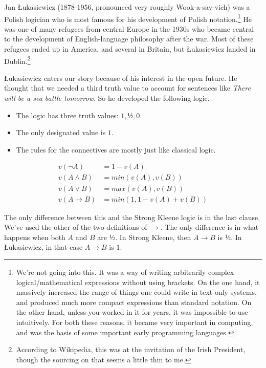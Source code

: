 \documentclass[
]{article}
\providecommand{\tightlist}{%
  \setlength{\itemsep}{0pt}\setlength{\parskip}{0pt}}\usepackage{longtable,booktabs,array}
\begin{document}
Jan Łukasiewicz (1878-1956, pronounced very roughly Wook-a-say-vich) was
a Polish logician who is most famous for his development of Polish
notation.\footnote{We're not going into this. It was a way of writing
  arbitrarily complex logical/mathematical expressions without using
  brackets. On the one hand, it massively increased the range of things
  one could write in text-only systems, and produced much more compact
  expressions than standard notation. On the other hand, unless you
  worked in it for years, it was impossible to use intuitively. For both
  these reasons, it became very important in computing, and was the
  basis of some important early programming languages.} He was one of
many refugees from central Europe in the 1930s who became central to the
development of English-language philosophy after the war. Most of these
refugees ended up in America, and several in Britain, but Łukasiewicz
landed in Dublin.\footnote{According to Wikipedia, this was at the
  invitation of the Irish President, though the sourcing on that seems a
  little thin to me.}

Łukasiewicz enters our story because of his interest in the open future.
He thought that we needed a third truth value to account for sentences
like \emph{There will be a sea battle tomorrow}. So he developed the
following logic.

\begin{itemize}
\tightlist
\item
  The logic has three truth values: \(1, ½, 0\).
\item
  The only designated value is \(1\).
\item
  The rules for the connectives are mostly just like classical logic.
\end{itemize}

\begin{align*}
v(\neg A) &= 1 - v(A) \\
v(A \wedge B) &= min(v(A), v(B)) \\
v(A \vee B) &= max(v(A), v(B)) \\
v(A \rightarrow B) &= min(1, 1 - v(A) + v(B)) 
\end{align*}

The only difference between this and the Strong Kleene logic is in the
last clause. We've used the other of the two definitions of
\(\rightarrow\). The only difference is in what happens when both \(A\)
and \(B\) are ½. In Strong Kleene, then \(A \rightarrow B\) is ½. In
Łukasiewicz, in that case \(A \rightarrow B\) is \(1\).
\end{document}
